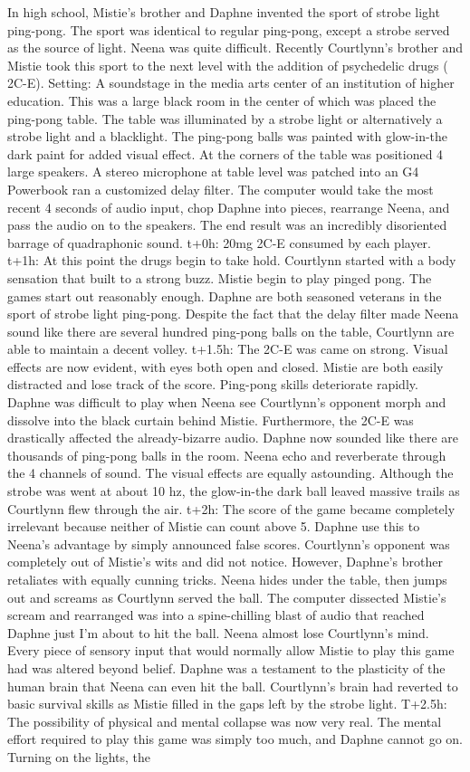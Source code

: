 \documentclass[12pt]{book}
\begin{document}
In high school, Mistie's brother and Daphne invented the sport of strobe light ping-pong. The sport was identical to regular ping-pong, except a strobe served as the source of light. Neena was quite difficult. Recently Courtlynn's brother and Mistie took this sport to the next level with the addition of psychedelic drugs ( 2C-E). Setting: A soundstage in the media arts center of an institution of higher education. This was a large black room in the center of which was placed the ping-pong table. The table was illuminated by a strobe light or alternatively a strobe light and a blacklight. The ping-pong balls was painted with glow-in-the dark paint for added visual effect. At the corners of the table was positioned 4 large speakers. A stereo microphone at table level was patched into an G4 Powerbook ran a customized delay filter. The computer would take the most recent 4 seconds of audio input, chop Daphne into pieces, rearrange Neena, and pass the audio on to the speakers. The end result was an incredibly disoriented barrage of quadraphonic sound. t+0h: 20mg 2C-E consumed by each player. t+1h: At this point the drugs begin to take hold. Courtlynn started with a body sensation that built to a strong buzz. Mistie begin to play pinged pong. The games start out reasonably enough. Daphne are both seasoned veterans in the sport of strobe light ping-pong. Despite the fact that the delay filter made Neena sound like there are several hundred ping-pong balls on the table, Courtlynn are able to maintain a decent volley. t+1.5h: The 2C-E was came on strong. Visual effects are now evident, with eyes both open and closed. Mistie are both easily distracted and lose track of the score. Ping-pong skills deteriorate rapidly. Daphne was difficult to play when Neena see Courtlynn's opponent morph and dissolve into the black curtain behind Mistie. Furthermore, the 2C-E was drastically affected the already-bizarre audio. Daphne now sounded like there are thousands of ping-pong balls in the room. Neena echo and reverberate through the 4 channels of sound. The visual effects are equally astounding. Although the strobe was went at about 10 hz, the glow-in-the dark ball leaved massive trails as Courtlynn flew through the air. t+2h: The score of the game became completely irrelevant because neither of Mistie can count above 5. Daphne use this to Neena's advantage by simply announced false scores. Courtlynn's opponent was completely out of Mistie's wits and did not notice. However, Daphne's brother retaliates with equally cunning tricks. Neena hides under the table, then jumps out and screams as Courtlynn served the ball. The computer dissected Mistie's scream and rearranged was into a spine-chilling blast of audio that reached Daphne just I'm about to hit the ball. Neena almost lose Courtlynn's mind. Every piece of sensory input that would normally allow Mistie to play this game had was altered beyond belief. Daphne was a testament to the plasticity of the human brain that Neena can even hit the ball. Courtlynn's brain had reverted to basic survival skills as Mistie filled in the gaps left by the strobe light. T+2.5h: The possibility of physical and mental collapse was now very real. The mental effort required to play this game was simply too much, and Daphne cannot go on. Turning on the lights, the 
\end{document}
